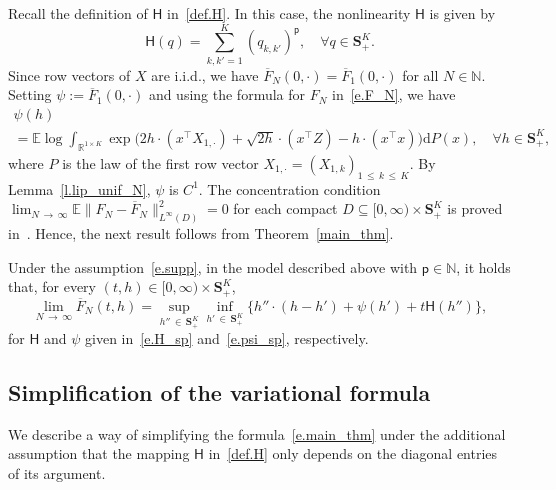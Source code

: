 \documentclass[AHL,Unicode,longabstracts,published]{cedram}
\newcommand{\N}{\mathbb{N}}
\newcommand{\R}{\mathbb{R}}
\newcommand{\E}{\mathbb{E}}
\renewcommand{\S}{\mathbf{S}}
\renewcommand{\d}{\mathrm{d}}
\renewcommand{\H}{\mathsf{H}}
\newcommand{\sfp}{\mathsf{p}}
\renewcommand{\leq}{\leqslant}
\renewcommand{\subset}{\subseteq}
\renewcommand{\bar}{\overline}
\newcommand{\Ll}{\left}
\newcommand{\Rr}{\right}
\let\oldforall\forall
\renewcommand*{\forall}{\mathrel{\oldforall}}
\begin{document}
Recall the definition of $\H$ in~\eqref{def.H}. In this case, the nonlinearity $\H$ is given by
\begin{equation}\label{e.H_sp}
\H(q) = \sum_{k,k'=1}^K\left(q_{k,k'}\right)^\sfp,\quad\forall q\in \S^K_+.
\end{equation}
Since row vectors of $X$ are i.i.d., we have $\bar F_N(0,\cdot)= \bar F_1(0,\cdot)$ for all $N\in\N$. Setting $\psi := \bar F_1(0,\cdot)$ and using the formula for $F_N$ in~\eqref{e.F_N}, we have
\begin{multline}\label{e.psi_sp}
\psi(h)\\
= \E \log \int_{\R^{1\times K}} \exp\bigg(2h\cdot (x^\intercal X_{1,\cdot})+\sqrt{2h}\cdot(x^\intercal Z)-h\cdot(x^\intercal x) \bigg) \d P(x),\quad\forall h\in\S^K_+,
\end{multline}
where $P$ is the law of the first row vector $X_{1,\cdot} = (X_{1,k})_{1\,\leq\,k\,\leq\,K}$. By Lemma~\ref{l.lip_unif_N}, $\psi$ is $C^1$. The concentration condition $\lim_{N\,\to\,\infty}\E\|F_N-\bar F_N\|^2_{L^\infty(D)}=0$ for each compact $D\subset [0,\infty)\times \S^K_+$ is proved in~\cite[Lemma~C.1]{HBJ}. Hence, the next result follows from Theorem~\ref{main_thm}.
\begin{coro}
Under the assumption~\eqref{e.supp}, in the model described above with $\sfp\in\N$, it holds that, for every $(t,h)\in[0,\infty)\times\S^K_+$,
\[
\lim_{N\,\to\,\infty}\bar F_N(t,h) = \sup_{h''\,\in\,\S^K_+}\inf_{h'\,\in\,\S^K_+}\big\{h''\cdot \Ll(h-h'\Rr)+\psi(h')+t\H(h'')\big\},
\]
for $\H$ and $\psi$ given in~\eqref{e.H_sp} and~\eqref{e.psi_sp}, respectively.
\end{coro}


\subsection{Simplification of the variational formula}



We describe a way of simplifying the formula~\eqref{e.main_thm} under the additional assumption that the mapping $\H$ in~\eqref{def.H} only depends on the diagonal entries of its argument.
\end{document}
